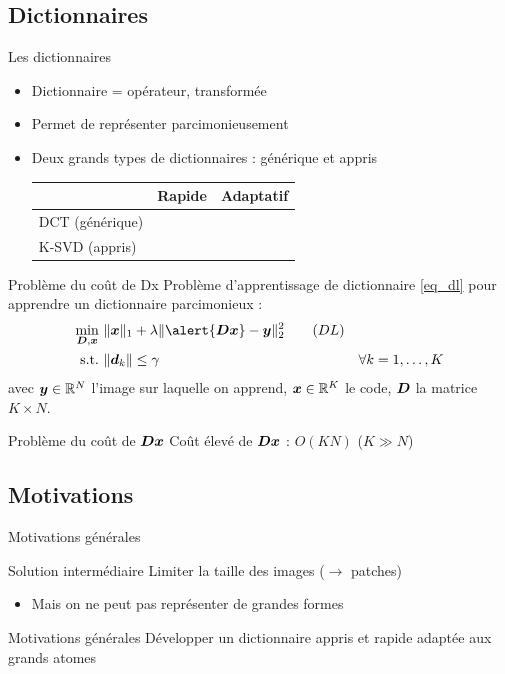 \subsection{Dictionnaires}
\begin{frame}{Les dictionnaires}
\begin{itemize}
\item Dictionnaire = opérateur, transformée 
\item Permet de représenter parcimonieusement
\item Deux grands types de dictionnaires : \alert{générique} et \alert{appris}
	\begin{table}[] \centering
	\begin{tabular}{@{}lcc@{}} \toprule
	 & Rapide & Adaptatif \\ \midrule
	DCT (générique) & \cmark & \xmark\\
	K-SVD (appris) & \xmark & \cmark \\ \bottomrule
	\end{tabular}
	\end{table}
\end{itemize}
\end{frame}

\begin{frame}{Problème du coût de Dx}
Problème d'apprentissage de dictionnaire \eqref{eq_dl} pour apprendre un dictionnaire parcimonieux :
\begin{align} 
\underset{\D,\x}{\min}~ & \| \x \|_1 + \lambda \| \alert{\D\x}-\y \|^2_2 \tag{$DL$}\label{eq_dl} \\
\text{s.t.}~ & \| \d_k \| \le \gamma & \forall k = 1,\dots,K \label{eq_dl_finite_norm} \notag
\end{align}
 avec $\bm{y} \in \mathbb{R}^N$ l'image sur laquelle on apprend, $\bm{x} \in \mathbb{R}^{K}$ le code, $\bm{D}$ la matrice $K \times N$.

\begin{alertblock}{Problème du coût de $\bm{D}\bm{x}$}
Coût élevé de $\bm{D}\bm{x}$ : \alert{$O(KN)$} ($K \gg N$)
\end{alertblock}
\end{frame}


\subsection{Motivations}
\begin{frame}{Motivations générales}
\begin{block}{Solution intermédiaire}
Limiter la taille des images ($\rightarrow$ \alert{patches})
\end{block}
\begin{itemize}
\item[\xmark] Mais on ne peut pas représenter de \alert{grandes formes}
\end{itemize}
\begin{exampleblock}{Motivations générales}
Développer un dictionnaire \alert{appris} et \alert{rapide} adaptée aux grands atomes
\end{exampleblock}
\end{frame}







